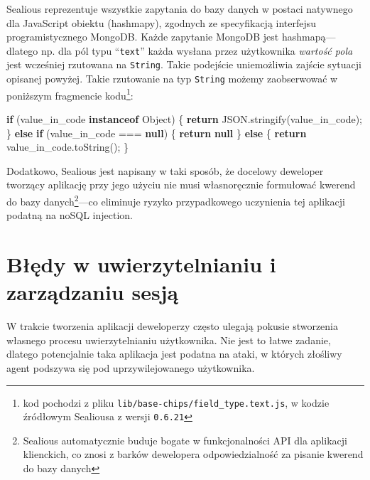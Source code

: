 \documentclass[12pt,polish,a4paper,]{report}
\newenvironment{Shaded}{}{}
\newcommand{\KeywordTok}[1]{\textcolor[rgb]{0.00,0.44,0.13}{\textbf{{#1}}}}
\newcommand{\VariableTok}[1]{\textcolor[rgb]{0.10,0.09,0.49}{{#1}}}
\newcommand{\ControlFlowTok}[1]{\textcolor[rgb]{0.00,0.44,0.13}{\textbf{{#1}}}}
\newcommand{\OperatorTok}[1]{\textcolor[rgb]{0.40,0.40,0.40}{{#1}}}
\newcommand{\AttributeTok}[1]{\textcolor[rgb]{0.49,0.56,0.16}{{#1}}}
\newcommand{\NormalTok}[1]{{#1}}
\begin{document}
Sealious reprezentuje wszystkie zapytania do bazy danych w postaci
natywnego dla JavaScript obiektu (hashmapy), zgodnych ze specyfikacją
interfejsu programistycznego MongoDB. Każde zapytanie MongoDB jest
hashmapą---dlatego np. dla pól typu ``\texttt{text}'' każda wysłana
przez użytkownika \emph{wartość pola} jest wcześniej rzutowana na
\texttt{String}. Takie podejście uniemożliwia zajście sytuacji opisanej
powyżej. Takie rzutowanie na typ \texttt{String} możemy zaobserwować w
poniższym fragmencie kodu\footnote{kod pochodzi z pliku
  \texttt{lib/base-chips/field\_type.text.js}, w kodzie źródłowym
  Sealiousa z wersji \texttt{0.6.21}}:

\begin{Shaded}
\begin{Highlighting}[]
\ControlFlowTok{if} \NormalTok{(value_in_code }\KeywordTok{instanceof} \NormalTok{Object) }\OperatorTok{\{}
    \ControlFlowTok{return} \VariableTok{JSON}\NormalTok{.}\AttributeTok{stringify}\NormalTok{(value_in_code)}\OperatorTok{;}
\OperatorTok{\}} \ControlFlowTok{else} \ControlFlowTok{if} \NormalTok{(value_in_code }\OperatorTok{===} \KeywordTok{null}\NormalTok{) }\OperatorTok{\{}
    \ControlFlowTok{return} \KeywordTok{null}
\OperatorTok{\}} \ControlFlowTok{else} \OperatorTok{\{}
    \ControlFlowTok{return} \VariableTok{value_in_code}\NormalTok{.}\AttributeTok{toString}\NormalTok{()}\OperatorTok{;}
\OperatorTok{\}}
\end{Highlighting}
\end{Shaded}

Dodatkowo, Sealious jest napisany w taki sposób, że docelowy deweloper
tworzący aplikację przy jego użyciu nie musi własnoręcznie formułować
kwerend do bazy danych\footnote{Sealious automatycznie buduje bogate w
  funkcjonalności API dla aplikacji klienckich, co znosi z barków
  dewelopera odpowiedzialność za pisanie kwerend do bazy danych}---co
eliminuje ryzyko przypadkowego uczynienia tej aplikacji podatną na noSQL
injection.

\chapter{Błędy w uwierzytelnianiu i zarządzaniu
sesją}\label{bux142ux119dy-w-uwierzytelnianiu-i-zarzux105dzaniu-sesjux105}

W trakcie tworzenia aplikacji deweloperzy często ulegają pokusie
stworzenia własnego procesu uwierzytelnianiu użytkownika. Nie jest to
łatwe zadanie, dlatego potencjalnie taka aplikacja jest podatna na
ataki, w których złośliwy agent podszywa się pod uprzywilejowanego
użytkownika.
\end{document}
